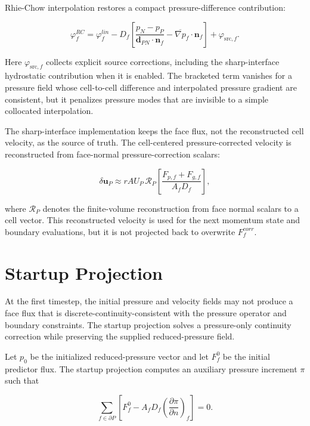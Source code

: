 \documentclass[11pt]{article}
\newcommand{\grad}{\nabla}
\begin{document}
Rhie-Chow interpolation restores a compact pressure-difference contribution:

\begin{equation}
  \varphi_f^{RC}
  =
  \varphi_f^{lin}
  -
  D_f
  \left[
    \frac{p_N-p_P}{\mathbf{d}_{PN}\cdot\mathbf{n}_f}
    -
    \overline{\grad p}_f\cdot\mathbf{n}_f
  \right]
  +
  \varphi_{\mathrm{src},f}.
  \label{eq:rhie-chow}
\end{equation}

Here \(\varphi_{\mathrm{src},f}\) collects explicit source corrections, including
the sharp-interface hydrostatic contribution when it is enabled.  The bracketed
term vanishes for a pressure field whose cell-to-cell difference and
interpolated pressure gradient are consistent, but it penalizes pressure modes
that are invisible to a simple collocated interpolation.

The sharp-interface implementation keeps the face flux, not the reconstructed
cell velocity, as the source of truth.  The cell-centered pressure-corrected
velocity is reconstructed from face-normal pressure-correction scalars:

\begin{equation}
  \delta\mathbf{u}_P
  \approx
  rAU_P\,
  \mathcal{R}_P
  \left[
    \frac{F_{p,f}+F_{g,f}}{A_fD_f}
  \right],
  \label{eq:velocity-writeback}
\end{equation}

where \(\mathcal{R}_P\) denotes the finite-volume reconstruction from face
normal scalars to a cell vector.  This reconstructed velocity is used for the
next momentum state and boundary evaluations, but it is not projected back to
overwrite \(F_f^{corr}\).

\section{Startup Projection}

At the first timestep, the initial pressure and velocity fields may not produce
a face flux that is discrete-continuity-consistent with the pressure operator
and boundary constraints.  The startup projection solves a pressure-only
continuity correction while preserving the supplied reduced-pressure field.

Let \(p_0\) be the initialized reduced-pressure vector and let \(F_f^0\) be the
initial predictor flux.  The startup projection computes an auxiliary pressure
increment \(\pi\) such that

\begin{equation}
  \sum_{f\in\partial P}
  \left[
    F_f^0
    -
    A_fD_f
    \left(\frac{\partial\pi}{\partial n}\right)_f
  \right]
  =
  0.
  \label{eq:startup-projection}
\end{equation}
\end{document}
